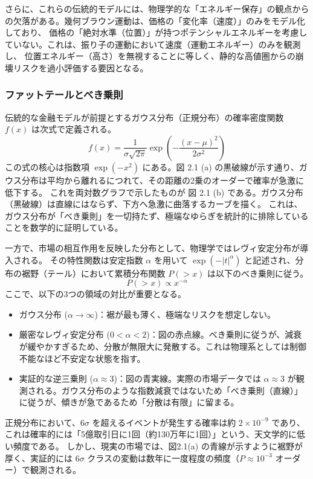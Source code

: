 \documentclass[11pt,a4paper,oneside]{ltjsarticle}
\begin{document}
さらに、これらの伝統的モデルには、物理学的な「エネルギー保存」の観点からの欠落がある。幾何ブラウン運動は、価格の「変化率（速度）」のみをモデル化しており、
価格の「絶対水準（位置）」が持つポテンシャルエネルギーを考慮していない。これは、振り子の運動において速度（運動エネルギー）のみを観測し、
位置エネルギー（高さ）を無視することに等しく、静的な高値圏からの崩壊リスクを過小評価する要因となる。



\subsubsection{ファットテールとべき乗則}
伝統的な金融モデルが前提とするガウス分布（正規分布）の確率密度関数 $f(x)$ は次式で定義される。
\begin{equation}
f(x) = \frac{1}{\sigma\sqrt{2\pi}} \exp\left( -\frac{(x-\mu)^2}{2\sigma^2} \right)
\end{equation}
この式の核心は指数項 $\exp(-x^2)$ にある。図 2.1 (a) の黒破線が示す通り、ガウス分布は平均から離れるにつれて、その距離の2乗のオーダーで確率が急激に低下する。
これを両対数グラフで示したものが 図 2.1 (b) である。ガウス分布（黒破線）は直線にはならず、下方へ急激に曲落するカーブを描く。
これは、ガウス分布が「べき乗則」を一切持たず、極端なゆらぎを統計的に排除していることを数学的に証明している。

一方で、市場の相互作用を反映した分布として、物理学ではレヴィ安定分布が導入される\cite{mandelbrot}。
その特性関数は安定指数 $\alpha$ を用いて $\exp(-|t|^\alpha)$ と記述され、分布の裾野（テール）において累積分布関数 $P(>x)$ は以下のべき乗則に従う。
\begin{equation}
P(>x) \propto x^{-\alpha}
\end{equation}
ここで、以下の3つの領域の対比が重要となる。
    \begin{itemize}
        \item ガウス分布 ($\alpha \to \infty$)：裾が最も薄く、極端なリスクを想定しない。
        \item 厳密なレヴィ安定分布 ($0 < \alpha < 2$)：図の赤点線。べき乗則に従うが、減衰が緩やかすぎるため、分散が無限大に発散する。これは物理系としては制御不能なほど不安定な状態を指す。
        \item 実証的な逆三乗則 ($\alpha \approx 3$)：図の青実線。実際の市場データでは $\alpha \approx 3$ が観測される。ガウス分布のような指数減衰ではないため「べき乗則（直線）」に従うが、傾きが急であるため「分散は有限」に留まる。
    \end{itemize}
正規分布において、$6\sigma$ を超えるイベントが発生する確率は約 $2 \times 10^{-9}$ であり、これは確率的には「5億取引日に1回（約130万年に1回）」という、天文学的に低い頻度である。
しかし、現実の市場では、図2.1(a) の青線が示すように裾野が厚く、実証的には $6\sigma$ クラスの変動は数年に一度程度の頻度（$P \approx 10^{-3}$ オーダー）で観測される\cite{cite:9}。
\end{document}
